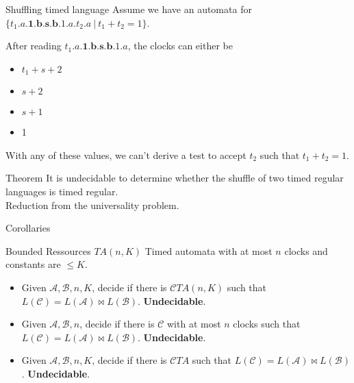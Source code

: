 \begin{frame}{Shuffling timed language}
  Assume we have an automata for $\{t_1.a.\mathbf{1.b.s.b}.1.a.t_2.a~|~t_1+t_2=1\}$.
  
  After reading $t_1.a.\mathbf{1.b.s.b}.1.a$, the clocks can either be
  \begin{itemize}
  \item $t_1+s+2$
  \item $s+2$
  \item $s+1$
  \item 1
  \end{itemize}
  
  With any of these values, we can't derive a test to accept $t_2$ such that $t_1+t_2=1$.
  
  \begin{exampleblock}{Theorem}
    It is undecidable to determine whether the shuffle of two timed regular languages is timed regular.\\
    Reduction from the universality problem.
  \end{exampleblock}
\end{frame}

\begin{frame}{Corollaries}
  \begin{block}{Bounded Ressources}
    $TA(n,K)$ Timed automata with at most $n$ clocks and constants are $\leq K$.\\
    \begin{itemize}
    \item Given $\mathcal{A,B},n,K$, decide if there is $\mathcal{C} TA(n,K)$ such that $L(\mathcal{C})=L(\mathcal{A})\bowtie L(\mathcal{B})$. \textbf{Undecidable}.
    \item Given $\mathcal{A,B},n$, decide if there is $\mathcal{C}$ with at most $n$ clocks such that $L(\mathcal{C})=L(\mathcal{A})\bowtie L(\mathcal{B})$. \textbf{Undecidable}.
    \item Given $\mathcal{A,B},n,K$, decide if there is $\mathcal{C} TA$ such that $L(\mathcal{C})=L(\mathcal{A})\bowtie L(\mathcal{B})$. \textbf{Undecidable}.
    \end{itemize}
  \end{block}
  \vfill
  
    
\end{frame}


